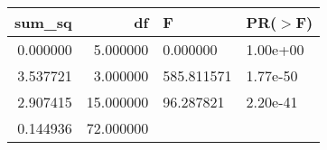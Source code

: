 \begin{tabular}{rrll}
\toprule
sum\_sq & df & F & PR($>$F) \\
\midrule
0.000000 & 5.000000 & 0.000000 & 1.00e+00 \\
3.537721 & 3.000000 & 585.811571 & 1.77e-50 \\
2.907415 & 15.000000 & 96.287821 & 2.20e-41 \\
0.144936 & 72.000000 &  &  \\
\bottomrule
\end{tabular}
